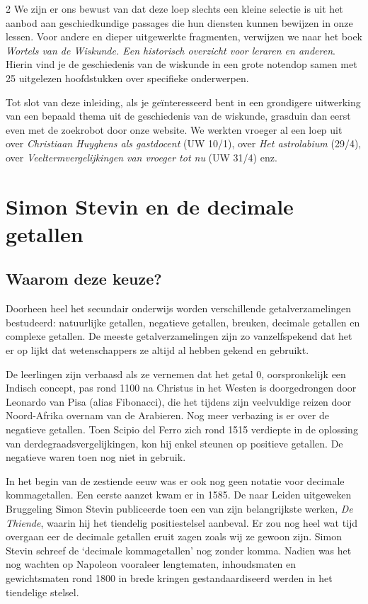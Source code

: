 \begin{multicols}{2}
    We zijn er ons bewust van dat deze loep slechts een kleine selectie is uit het aanbod aan geschiedkundige passages die hun diensten kunnen bewijzen in onze lessen. Voor andere en dieper uitgewerkte fragmenten, verwijzen we naar het boek \emph{Wortels van de Wiskunde. Een historisch overzicht voor leraren en anderen}. Hierin vind je de geschiedenis van de wiskunde in een grote notendop samen met 25 uitgelezen hoofdstukken over specifieke onderwerpen.

    Tot slot van deze inleiding, als je geïnteresseerd bent in een grondigere uitwerking van een bepaald thema uit de geschiedenis van de wiskunde, grasduin dan eerst even met de zoekrobot door onze website. We werkten vroeger al een loep uit over \emph{Christiaan Huyghens als gastdocent} (UW 10/1), over \emph{Het astrolabium} (29/4), over \emph{Veeltermvergelijkingen van vroeger tot nu} (UW 31/4) enz. 
	
	
	\section{Simon Stevin en de decimale getallen}
	\subsection*{Waarom deze keuze?}
    
    Doorheen heel het secundair onderwijs worden verschillende getalverzamelingen bestudeerd: natuurlijke getallen, negatieve getallen, breuken, decimale getallen en complexe getallen. De meeste getalverzamelingen zijn zo vanzelfspekend dat het er op lijkt dat wetenschappers ze altijd al hebben gekend en gebruikt. 
    
    De leerlingen zijn verbaasd als ze vernemen dat het getal 0, oorspronkelijk een Indisch concept, pas rond 1100 na Christus in het Westen is doorgedrongen door Leonardo van Pisa (alias Fibonacci), die het tijdens zijn veelvuldige reizen door Noord-Afrika overnam van de Arabieren. Nog meer verbazing is er over de negatieve getallen. Toen Scipio del Ferro zich rond 1515 verdiepte in de oplossing van derdegraadsvergelijkingen, kon hij enkel steunen op positieve getallen. De negatieve waren toen nog niet in gebruik. 
    
    In het begin van de zestiende eeuw was er ook nog geen notatie voor decimale kommagetallen. Een eerste aanzet kwam er  in 1585. De naar Leiden uitgeweken Bruggeling Simon Stevin publiceerde toen een van zijn belangrijkste werken, \emph{De Thiende}, waarin hij het tiendelig positiestelsel aanbeval. Er zou nog heel wat tijd overgaan eer de decimale getallen eruit zagen zoals wij ze gewoon zijn. Simon Stevin schreef de `decimale kommagetallen' nog zonder komma. Nadien was het nog wachten op Napoleon vooraleer lengtematen, inhoudsmaten en gewichtsmaten rond 1800 in brede kringen gestandaardiseerd werden in het tiendelige stelsel.


\end{multicols}
